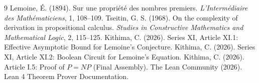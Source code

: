 \documentclass[11pt,a4paper]{article}
\begin{document}

\begin{thebibliography}{9}
  Lemoine, É. (1894). Sur une propriété des nombres premiers. \emph{L'Intermédiaire des Mathématiciens}, 1, 108–109.
  Tseitin, G. S. (1968). On the complexity of derivation in propositional calculus. \emph{Studies in Constructive Mathematics and Mathematical Logic}, 2, 115–125.
  Kithima, C. (2026). Series XI, Article XI.1: Effective Asymptotic Bound for Lemoine's Conjecture.
  Kithima, C. (2026). Series XI, Article XI.2: Boolean Circuit for Lemoine's Equation.
  Kithima, C. (2026). Article I.5: Proof of \(P = NP\) (Final Assembly).
  The Lean Community (2026). Lean 4 Theorem Prover Documentation.
\end{thebibliography}
\end{document}
